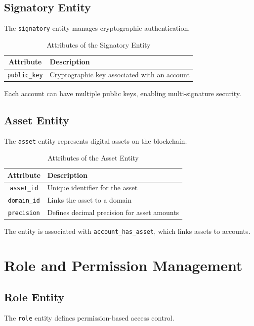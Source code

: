 \documentclass{article}
\begin{document}
\subsection{Signatory Entity}
The \texttt{signatory} entity manages cryptographic authentication.

\begin{table}[h]
    \centering
    \caption{Attributes of the Signatory Entity}
    \label{tab:signatory_attributes}
    \begin{tabular}{|c|l|}
        \hline
        \textbf{Attribute}   & \textbf{Description}                         \\ \hline
        \texttt{public\_key} & Cryptographic key associated with an account \\ \hline
    \end{tabular}
\end{table}

Each account can have multiple public keys, enabling multi-signature security.

\subsection{Asset Entity}
The \texttt{asset} entity represents digital assets on the blockchain.

\begin{table}[h]
    \centering
    \caption{Attributes of the Asset Entity}
    \label{tab:asset_attributes}
    \begin{tabular}{|c|l|}
        \hline
        \textbf{Attribute}  & \textbf{Description}                        \\ \hline
        \texttt{asset\_id}  & Unique identifier for the asset             \\ \hline
        \texttt{domain\_id} & Links the asset to a domain                 \\ \hline
        \texttt{precision}  & Defines decimal precision for asset amounts \\ \hline
    \end{tabular}
\end{table}

The entity is associated with \texttt{account\_has\_asset}, which links assets to accounts.

\section{Role and Permission Management}
\subsection{Role Entity}
The \texttt{role} entity defines permission-based access control.
\end{document}
